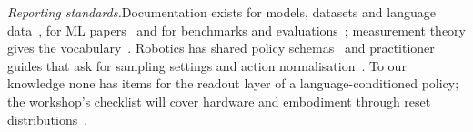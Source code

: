 \documentclass[conference]{IEEEtran}
\newcommand{\head}[1]{\textit{#1}\hspace{0.4em}}
\begin{document}
\head{Reporting standards.}Documentation exists for models, datasets and language data~\cite{mitchell2019model,gebru2021datasheets,bender2018data}, for ML papers~\cite{pineau2021improving,kapoor2024reforms,kapoor2023leakage} and for benchmarks and evaluations~\cite{reuel2024betterbench,sokol2025benchmarkcards,bean2025measuring,bordes2025eval}; measurement theory gives the vocabulary~\cite{jacobs2021measurement,wallach2025position}. Robotics has shared policy schemas~\cite{xpolicylab2026xpolicylab} and practitioner guides that ask for sampling settings and action normalisation~\cite{physicalailab2026robot}. To our knowledge none has items for the readout layer of a language-conditioned policy; the workshop's checklist will cover hardware and embodiment through reset distributions~\cite{park2026everything}.
\end{document}
